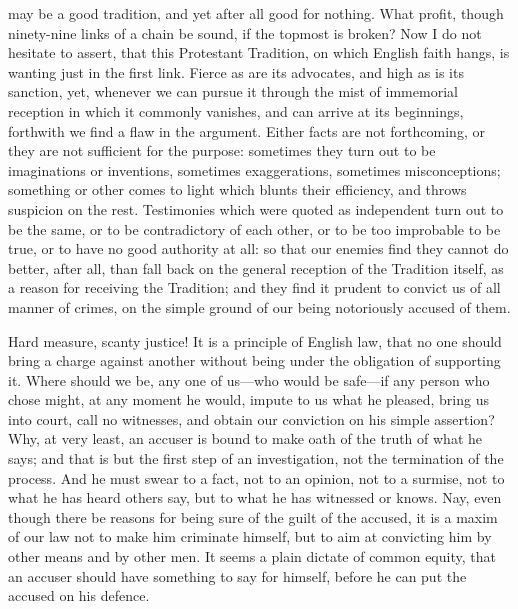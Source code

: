 may be a good tradition, and yet after all good for
nothing. What profit, though ninety-nine links of a chain
be sound, if the topmost is broken? Now I do not hesitate
to assert, that this Protestant Tradition, on which
English faith hangs, is wanting just in the first link.
Fierce as are its advocates, and high as is its sanction,
yet, whenever we can pursue it through the mist of
immemorial reception in which it commonly vanishes, and
can arrive at its beginnings, forthwith we find a flaw in
the argument. Either facts are not forthcoming, or they
are not sufficient for the purpose: sometimes they turn
out to be imaginations or inventions, sometimes
exaggerations, sometimes misconceptions; something or
other comes to light which blunts their efficiency, and
throws suspicion on the rest. Testimonies which were
quoted as independent turn out to be the same, or to be
contradictory of each other, or to be too improbable to
be true, or to have no good authority at all: so that our
enemies find they cannot do better, after all, than fall
back on the general reception of the Tradition itself, as
a reason for receiving the Tradition; and they find it
prudent to convict us of all manner of crimes, on the
simple ground of our being notoriously accused of them.

Hard measure, scanty justice! It is a principle of
English law, that no one should bring a charge against
another without being under the obligation of supporting
it. Where should we be, any one of us—who would be
safe—if any person who chose might, at any moment he
would, impute to us what he pleased, bring us into court,
call no witnesses, and obtain our conviction on his
simple assertion? Why, at very least, an accuser is bound
to make oath of the truth of what he says; and that is
but the first step of an investigation, not the
termination of the process. And he must swear to a fact,
not to an opinion, not to a surmise, not to what he has
heard others say, but to what he has witnessed or knows.
Nay, even though there be reasons for being sure of the
guilt of the accused, it is a maxim of our law not to
make him criminate himself, but to aim at convicting him
by other means and by other men. It seems a plain dictate
of common equity, that an accuser should have something
to say for himself, before he can put the accused on his defence.

